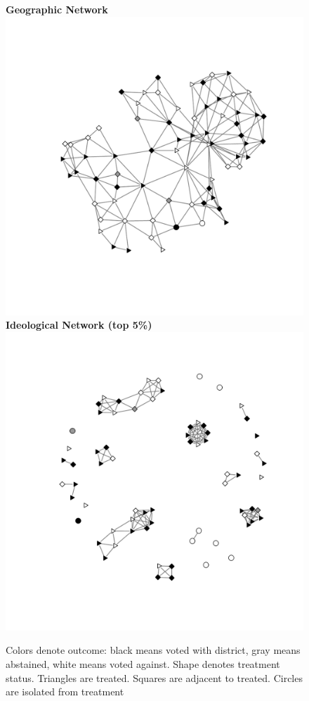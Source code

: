 \documentclass[12pt]{article}
\begin{document}
\begin{figure}
\centering
{\bf Geographic Network} \\
\includegraphics[scale=.55]{./images/coppock_geographic_net.pdf}\\
{\bf Ideological Network (top 5\%)} \\
\includegraphics[scale=.55]{./images/coppock_ideological_net.pdf}
\caption{Colors denote outcome: black means voted with district, gray means abstained, white means voted against. Shape denotes treatment status. Triangles are treated. Squares are adjacent to treated. Circles are isolated from treatment}
\end{figure}




\clearpage


\end{document}
